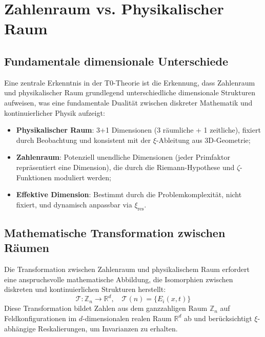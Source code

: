 \section{Zahlenraum vs. Physikalischer Raum}
\label{sec:number_physical_space}
\subsection{Fundamentale dimensionale Unterschiede}
\label{subsec:dimensional_differences}
Eine zentrale Erkenntnis in der T0-Theorie ist die Erkennung, dass Zahlenraum und physikalischer Raum grundlegend unterschiedliche dimensionale Strukturen aufweisen, was eine fundamentale Dualität zwischen diskreter Mathematik und kontinuierlicher Physik aufzeigt:
\begin{highlight}
	\begin{itemize}
		\item \textbf{Physikalischer Raum}: 3+1 Dimensionen (3 räumliche + 1 zeitliche), fixiert durch Beobachtung und konsistent mit der $\xi$-Ableitung aus 3D-Geometrie;
		\item \textbf{Zahlenraum}: Potenziell unendliche Dimensionen (jeder Primfaktor repräsentiert eine Dimension), die durch die Riemann-Hypothese und $\zeta$-Funktionen moduliert werden;
		\item \textbf{Effektive Dimension}: Bestimmt durch die Problemkomplexität, nicht fixiert, und dynamisch anpassbar via $\xi_{\text{res}}$.
	\end{itemize}
\end{highlight}
\subsection{Mathematische Transformation zwischen Räumen}
\label{subsec:mathematical_transformation}
Die Transformation zwischen Zahlenraum und physikalischem Raum erfordert eine anspruchsvolle mathematische Abbildung, die Isomorphien zwischen diskreten und kontinuierlichen Strukturen herstellt:
\begin{equation}
	\mathcal{T}: \mathbb{Z}_n \to \mathbb{R}^d, \quad \mathcal{T}(n) = \{E_i(x,t)\}
\end{equation}
Diese Transformation bildet Zahlen aus dem ganzzahligen Raum $\mathbb{Z}_n$ auf Feldkonfigurationen im $d$-dimensionalen realen Raum $\mathbb{R}^d$ ab und berücksichtigt $\xi$-abhängige Reskalierungen, um Invarianzen zu erhalten.
